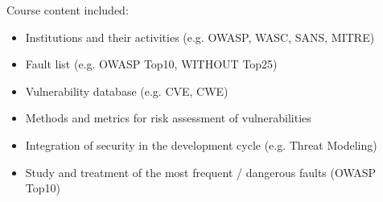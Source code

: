 Course content included:
\begin{itemize}
    \item Institutions and their activities (e.g. OWASP, WASC, SANS, MITRE)
    \item Fault list (e.g. OWASP Top10, WITHOUT Top25)
    \item Vulnerability database (e.g. CVE, CWE)
    \item Methods and metrics for risk assessment of vulnerabilities
    \item Integration of security in the development cycle (e.g. Threat Modeling)
    \item Study and treatment of the most frequent / dangerous faults (OWASP Top10)
\end{itemize}
